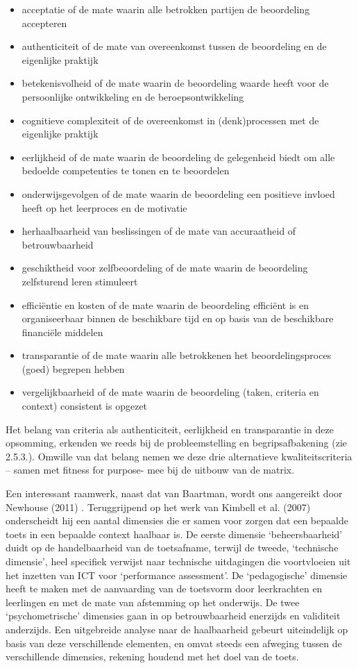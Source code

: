 \documentclass[
  letterpaper,
]{report}
\providecommand{\tightlist}{%
  \setlength{\itemsep}{0pt}\setlength{\parskip}{0pt}}
\begin{document}
\begin{itemize}
\tightlist
\item
  acceptatie of de mate waarin alle betrokken partijen de beoordeling
  accepteren
\item
  authenticiteit of de mate van overeenkomst tussen de beoordeling en de
  eigenlijke praktijk
\item
  betekenisvolheid of de mate waarin de beoordeling waarde heeft voor de
  persoonlijke ontwikkeling en de beroepsontwikkeling
\item
  cognitieve complexiteit of de overeenkomst in (denk)processen met de
  eigenlijke praktijk
\item
  eerlijkheid of de mate waarin de beoordeling de gelegenheid biedt om
  alle bedoelde competenties te tonen en te beoordelen
\item
  onderwijsgevolgen of de mate waarin de beoordeling een positieve
  invloed heeft op het leerproces en de motivatie
\item
  herhaalbaarheid van beslissingen of de mate van accuraatheid of
  betrouwbaarheid
\item
  geschiktheid voor zelfbeoordeling of de mate waarin de beoordeling
  zelfsturend leren stimuleert
\item
  efficiëntie en kosten of de mate waarin de beoordeling efficiënt is en
  organiseerbaar binnen de beschikbare tijd en op basis van de
  beschikbare financiële middelen
\item
  transparantie of de mate waarin alle betrokkenen het
  beoordelingsproces (goed) begrepen hebben
\item
  vergelijkbaarheid of de mate waarin de beoordeling (taken, criteria en
  context) consistent is opgezet
\end{itemize}

Het belang van criteria als authenticiteit, eerlijkheid en transparantie
in deze opsomming, erkenden we reeds bij de probleemstelling en
begripsafbakening (zie 2.5.3.). Omwille van dat belang nemen we deze
drie alternatieve kwaliteitscriteria -- samen met fitness for purpose-
mee bij de uitbouw van de matrix.

Een interessant raamwerk, naast dat van Baartman, wordt ons aangereikt
door Newhouse (2011) . Teruggrijpend op het werk van Kimbell et al.
(2007) onderscheidt hij een aantal dimensies die er samen voor zorgen
dat een bepaalde toets in een bepaalde context haalbaar is. De eerste
dimensie `beheersbaarheid' duidt op de handelbaarheid van de
toetsafname, terwijl de tweede, `technische dimensie', heel specifiek
verwijst naar technische uitdagingen die voortvloeien uit het inzetten
van ICT voor `performance assessment'. De `pedagogische' dimensie heeft
te maken met de aanvaarding van de toetsvorm door leerkrachten en
leerlingen en met de mate van afstemming op het onderwijs. De twee
`psychometrische' dimensies gaan in op betrouwbaarheid enerzijds en
validiteit anderzijds. Een uitgebreide analyse naar de haalbaarheid
gebeurt uiteindelijk op basis van deze verschillende elementen, en omvat
steeds een afweging tussen de verschillende dimensies, rekening houdend
met het doel van de toets.
\end{document}
